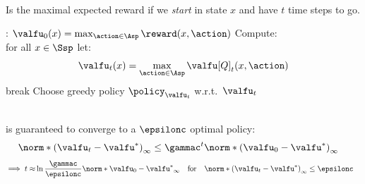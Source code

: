 \begin{defnbox}\nospacing
  \begin{defn}\label{defn:value_to_go}\leavevmode\\
    Is the maximal expected reward if we \textit{start} in state $x$ and have $t$ time steps to go.
  \end{defn}
\end{defnbox}
\begin{algorithmbox}
\begin{algo}\label{algorithm:value_iteration}\leavevmode
    \begin{algorithmic}[1]
      \item[] : $\valfu_{0}(x)=\max_{\action\in\Asp}\reward(x,\action)$
        \State Compute:\leavevmode\\
        \State for all $x\in\Ssp$ let:
        \begin{align*}
          \valfu_{t}(x)=\max_{\action\in\Asp}\valfu[Q]_{t}(x,\action)
        \end{align*}
        \State break
        \EndIf
        \EndFor
        \State Choose greedy policy $\policy_{\valfu_{t}}$ w.r.t.\ $\valfu_{t}$
    \end{algorithmic}
  \end{algo}
\end{algorithmbox}
\begin{corbox}\nospacing
  \begin{cor}\label{algorithm:value_iteration_cvg}\leavevmode\\
     is guaranteed to converge to a $\epsilonc$ optimal policy:
    \begin{align}
     \norm*{\left(\valfu_{t}-\valfu^{*}\right)}_{\infty}&\leq\gammac^{t}\norm*{\left(\valfu_{0}-\valfu^{*}\right)}_{\infty}
    \end{align}
    \begin{align*}
    \implies t\approx& \ln\frac{\gammac}{\epsilonc}\norm*{\valfu_{0}-\valfu^{*}}_{\infty}&&\text{for}&&\norm*{\left(\valfu_{t}-\valfu^{*}\right)}_{\infty}\leq\epsilonc
    \end{align*}
  \end{cor}
\end{corbox}
